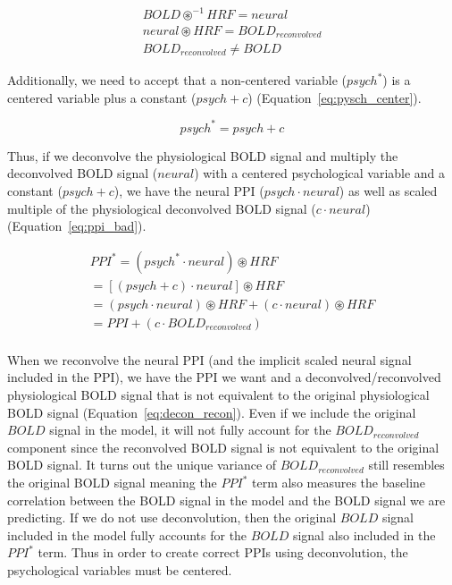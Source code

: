 \documentclass[phd,figures,tables,ackpage,abstractpage,publicabstractpage]{uithesis}
\begin{document}
\begin{equation}
  \begin{aligned}
    BOLD \circledast^{-1} HRF = neural \\
    neural \circledast HRF = BOLD_{reconvolved} \\
    BOLD_{reconvolved} \neq BOLD
  \end{aligned}
 \label{eq:decon_recon}
\end{equation}

Additionally, we need to accept that a non-centered variable ($psych^*$)
is a centered variable plus a constant ($psych + c$) (Equation~\ref{eq:pysch_center}).

\begin{equation}
  psych^* = psych + c
 \label{eq:pysch_center}
\end{equation}

Thus, if we deconvolve the physiological BOLD signal and multiply the deconvolved
BOLD signal ($neural$) with a centered psychological variable and a constant
($psych + c$), we have the neural PPI ($psych \cdot neural$)
as well as scaled multiple of the physiological deconvolved BOLD signal
($c \cdot neural$) (Equation~\ref{eq:ppi_bad}).

\begin{equation}
  \begin{aligned}
    PPI^* = (psych^* \cdot neural) \circledast HRF \\
    = [(psych + c) \cdot neural] \circledast HRF \\
    = (psych \cdot neural) \circledast HRF + (c \cdot neural) \circledast HRF \\
    = PPI + (c \cdot BOLD_{reconvolved}) \\
  \end{aligned}
 \label{eq:ppi_bad}
\end{equation}

When we reconvolve the neural PPI (and the implicit scaled neural signal included in the PPI),
we have the PPI we want and a deconvolved/reconvolved physiological BOLD signal that is not equivalent to the
original physiological BOLD signal (Equation~\ref{eq:decon_recon}).
Even if we include the original $BOLD$ signal in the model, it will not fully account for the 
$BOLD_{reconvolved}$ component since the reconvolved BOLD signal is not equivalent to
the original BOLD signal.
It turns out the unique variance of $BOLD_{reconvolved}$ still resembles the original BOLD signal
meaning the $PPI^*$ term also measures the baseline correlation between the BOLD signal in the model
and the BOLD signal we are predicting.
If we do not use deconvolution, then the original $BOLD$ signal included in the model fully accounts
for the $BOLD$ signal also included in the $PPI^*$ term.
Thus in order to create correct PPIs using deconvolution, the psychological variables must be centered.
\end{document}
